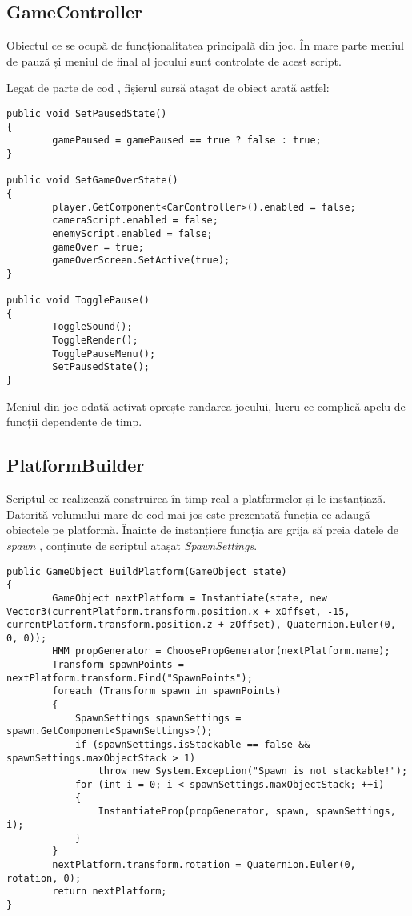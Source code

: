\subsection{GameController}

Obiectul ce se ocupă de funcționalitatea principală din joc. În mare parte meniul de pauză și meniul de final al jocului sunt controlate de acest script.\par

Legat de parte de cod , fișierul sursă atașat de obiect arată astfel:\par

\begin{lstlisting}[caption=Caption example.,
  label=a_label]
public void SetPausedState()
{
        gamePaused = gamePaused == true ? false : true;
}

public void SetGameOverState()
{
        player.GetComponent<CarController>().enabled = false;
        cameraScript.enabled = false;
        enemyScript.enabled = false;
        gameOver = true;
        gameOverScreen.SetActive(true);
}

public void TogglePause()
{
        ToggleSound();
        ToggleRender();
        TogglePauseMenu();
        SetPausedState();
}
\end{lstlisting}

Meniul din joc odată activat oprește randarea jocului, lucru ce complică apelu de funcții dependente de timp.\par

\subsection{PlatformBuilder}

Scriptul ce realizează construirea în timp real a platformelor și le instanțiază. Datorită volumului mare de cod mai jos este prezentată funcția ce adaugă obiectele pe platformă. Înainte de instanțiere funcția are grija să preia datele de \textit{spawn} , conținute de scriptul atașat \textit{SpawnSettings}.\par
\begin{lstlisting}[caption=Caption example.,
  label=a_label]
public GameObject BuildPlatform(GameObject state)
{
        GameObject nextPlatform = Instantiate(state, new Vector3(currentPlatform.transform.position.x + xOffset, -15, currentPlatform.transform.position.z + zOffset), Quaternion.Euler(0, 0, 0));
        HMM propGenerator = ChoosePropGenerator(nextPlatform.name);
        Transform spawnPoints = nextPlatform.transform.Find("SpawnPoints");
        foreach (Transform spawn in spawnPoints)
        {
            SpawnSettings spawnSettings = spawn.GetComponent<SpawnSettings>();
            if (spawnSettings.isStackable == false && spawnSettings.maxObjectStack > 1)
                throw new System.Exception("Spawn is not stackable!");
            for (int i = 0; i < spawnSettings.maxObjectStack; ++i)
            {
                InstantiateProp(propGenerator, spawn, spawnSettings, i);
            }
        }
        nextPlatform.transform.rotation = Quaternion.Euler(0, rotation, 0);
        return nextPlatform;
}
\end{lstlisting}


